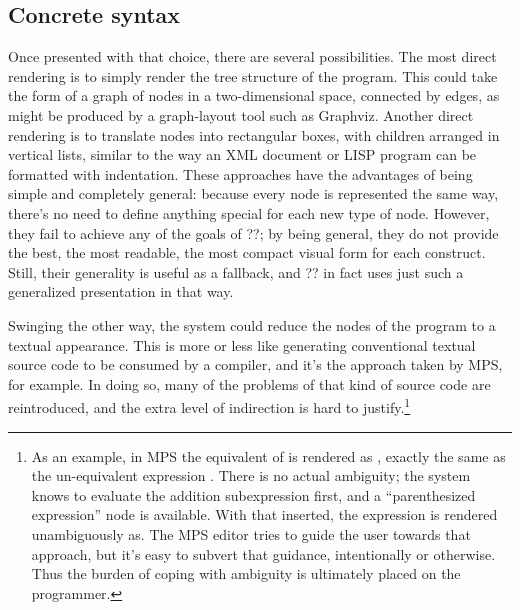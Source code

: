 \subsection{Concrete syntax}
Once presented with that choice, there are several possibilities. The most direct rendering is to simply render the tree structure of the program. This could take the form of a graph of nodes in a two-dimensional space, connected by edges, as might be produced by a graph-layout tool such as Graphviz\cite{graphviz}. Another direct rendering is to translate nodes into rectangular boxes, with children arranged in vertical lists, similar to the way an XML document or LISP program can be formatted with indentation. These approaches have the advantages of being simple and completely general: because every node is represented the same way, there's no need to define anything special for each new type of node. However, they fail to achieve any of the goals of ??; by being general, they do not provide the best, the most readable, the most compact visual form for each construct. Still, their generality is useful as a fallback, and ?? in fact uses just such a generalized presentation in that way.

Swinging the other way, the system could reduce the nodes of the program to a textual appearance. This is more or less like generating conventional textual source code to be consumed by a compiler, and it's the approach taken by MPS\cite{mps}, for example. In doing so, many of the problems of that kind of source code are reintroduced, and the extra level of indirection is hard to justify.\footnote{As an example, in MPS the equivalent of  is rendered as , exactly the same as the un-equivalent expression . There is no actual ambiguity; the system knows to evaluate the addition subexpression first, and a ``parenthesized expression'' node is available. With that inserted, the expression is rendered unambiguously as. The MPS editor tries to guide the user towards that approach, but it's easy to subvert that guidance, intentionally or otherwise. Thus the burden of coping with ambiguity is ultimately placed on the programmer.}

